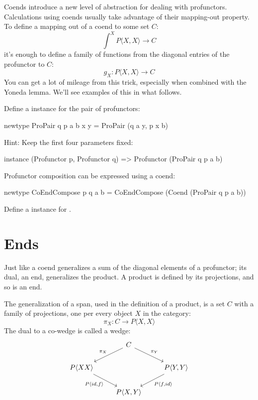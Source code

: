 \documentclass[DaoFP]{subfiles}
\begin{document}
Coends introduce a new level of abstraction for dealing with profunctors. Calculations using coends usually take advantage of their mapping-out property. To define a mapping out of a coend to some set $C$:
\[ \int^X P \langle X, X \rangle \to C \]
 it's enough to define a family of functions from the diagonal entries of the profunctor to $C$:
 \[ g_X \colon P \langle X, X \rangle \to C \]
 You can get a lot of mileage from this trick, especially when combined with the Yoneda lemma. We'll see examples of this in what follows.

\begin{exercise}
Define a  instance for the pair of profunctors:
\begin{haskell}
newtype ProPair q p a b x y = ProPair (q a y, p x b)
\end{haskell}
Hint: Keep the first four parameters fixed:
\begin{haskell}
instance (Profunctor p, Profunctor q) => Profunctor (ProPair q p a b)
\end{haskell}
\end{exercise}

\begin{exercise}
Profunctor composition can be expressed using a coend:
\begin{haskell}
newtype CoEndCompose p q a b = CoEndCompose (Coend (ProPair q p a b))
\end{haskell}
Define a  instance for .
\end{exercise}


\section{Ends}

Just like a coend generalizes a sum of the diagonal elements of a profunctor; its dual, an end, generalizes the product. A product is defined by its projections, and so is an end. 

The generalization of a span, used in the definition of a product, is a set $C$ with a family of projections, one per every object $X$ in the category:
\[ \pi_X \colon C \to P \langle X, X \rangle \]
The dual to a co-wedge is called a wedge:
\[
 \begin{tikzcd}
 &C
 \arrow[ld, "\pi_X"']
 \arrow[rd, "\pi_Y"]
 \\
 P \langle X X \rangle
 \arrow[dr, "{P \langle id, f \rangle}"']
 &&P \langle Y, Y \rangle
 \arrow[dl, "{P \langle f, id \rangle}"]
 \\
 & P \langle X, Y \rangle
 \end{tikzcd}
\]
\end{document}
